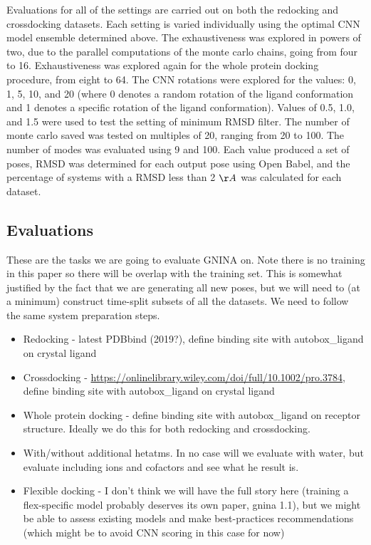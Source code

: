 \documentclass[journal=jcisd8,manuscript=article]{achemso}
\begin{document}
Evaluations for all of the settings are carried out on both the redocking and crossdocking datasets. Each setting is varied individually using the optimal CNN model ensemble determined above. The exhaustiveness was explored in powers of two, due to the parallel computations of the monte carlo chains, going from four to 16. Exhaustiveness was explored again for the whole protein docking procedure, from eight to 64. The CNN rotations were explored for the values: 0, 1, 5, 10, and 20 (where 0 denotes a random rotation of the ligand conformation and 1 denotes a specific rotation of the ligand conformation). Values of 0.5, 1.0, and 1.5 were used to test the setting of minimum RMSD filter. The number of monte carlo saved was tested on multiples of 20, ranging from 20 to 100. The number of modes was evaluated using 9 and 100. Each value produced a set of poses, RMSD was determined for each output pose using Open Babel, and the percentage of systems with a RMSD less than 2 $\AA$ was calculated for each dataset.

\subsection{Evaluations}
These are the tasks we are going to evaluate GNINA on.  Note there is no training in this paper so there will be overlap with the training set.  This is somewhat justified by the fact that we are generating all new poses, but we will need to (at a minimum) construct time-split subsets of all the datasets.  We need to follow the same system preparation steps.

\begin{itemize}
    \item Redocking - latest PDBbind (2019?), define binding site with autobox\_ligand on crystal ligand
    \item Crossdocking - \url{https://onlinelibrary.wiley.com/doi/full/10.1002/pro.3784}, define binding site with autobox\_ligand on crystal ligand
    \item Whole protein docking - define binding site with autobox\_ligand on receptor structure.  Ideally we do this for both redocking and crossdocking.
    \item With/without additional hetatms.  In no case will we evaluate with water, but evaluate including ions and cofactors and see what he result is.
    \item Flexible docking - I don't think we will have the full story here (training a flex-specific model probably deserves its own paper, gnina 1.1), but we might be able to assess existing models and make best-practices recommendations (which might be to avoid CNN scoring in this case for now)
\end{itemize}
\end{document}

